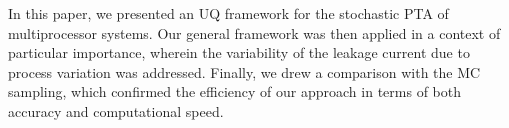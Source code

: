 In this paper, we presented an UQ framework for the stochastic PTA of multiprocessor systems. Our general framework was then applied in a context of particular importance, wherein the variability of the leakage current due to process variation was addressed. Finally, we drew a comparison with the MC sampling, which confirmed the efficiency of our approach in terms of both accuracy and computational speed.
